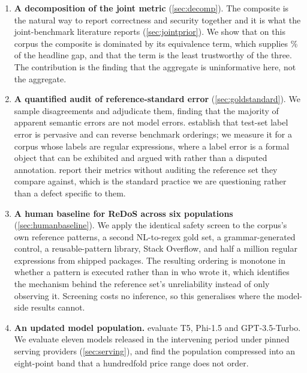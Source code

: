 \documentclass[11pt]{article}
\begin{document}
\begin{enumerate}
  \item \textbf{A decomposition of the joint metric}
  (\cref{sec:decomp}). The composite is the natural way to report
  correctness and security together and it is what the joint-benchmark
  literature reports (\cref{sec:jointprior}). We show that on this corpus the
  composite is dominated by its equivalence term, which supplies \equivshare{}\% of the
  headline gap, and that the term is the least trustworthy of the three. The
  contribution is the finding that the aggregate is uninformative here, not
  the aggregate.

  \item \textbf{A quantified audit of reference-standard error}
  (\cref{sec:goldstandard}). We sample disagreements and adjudicate them,
  finding that the majority of apparent semantic errors are not model errors.
  \citet{northcutt2021labelerrors} establish that test-set label error is
  pervasive and can reverse benchmark orderings; we measure it for a corpus
  whose labels are regular expressions, where a label error is a formal
  object that can be exhibited and argued with rather than a disputed
  annotation. \citet{siddiq2024regexeval} report their metrics without
  auditing the reference set they compare against, which is the standard
  practice we are questioning rather than a defect specific to them.

  \item \textbf{A human baseline for ReDoS across six populations}
  (\cref{sec:humanbaseline}). We apply the identical safety screen to the
  corpus's own reference patterns, a second NL-to-regex gold set, a
  grammar-generated control, a reusable-pattern library, Stack Overflow, and
  half a million regular expressions from shipped packages. The resulting
  ordering is monotone in whether a pattern is executed rather than in who
  wrote it, which identifies the mechanism behind the reference set's
  unreliability instead of only observing it. Screening costs no inference,
  so this generalises where the model-side results cannot.

  \item \textbf{An updated model population.}
  \citet{siddiq2024regexeval} evaluate T5, Phi-1.5 and GPT-3.5-Turbo. We
  evaluate eleven models released in the intervening period under pinned
  serving providers (\cref{sec:serving}), and find the population compressed
  into an eight-point band that a hundredfold price range does not order.


\end{enumerate}
\end{document}
